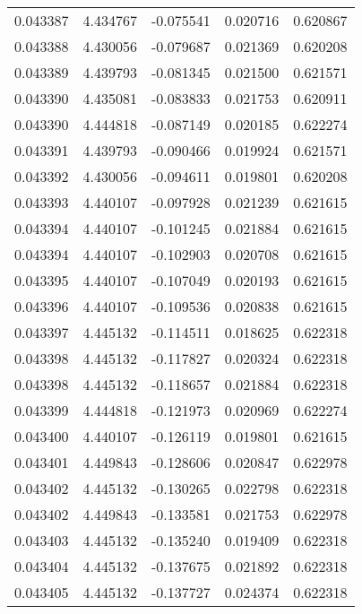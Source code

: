 \begin{tabular}{lrrrr}
0.043387    &  4.434767 & -0.075541 &  0.020716 &             0.620867 \\
0.043388    &  4.430056 & -0.079687 &  0.021369 &             0.620208 \\
0.043389    &  4.439793 & -0.081345 &  0.021500 &             0.621571 \\
0.043390    &  4.435081 & -0.083833 &  0.021753 &             0.620911 \\
0.043390    &  4.444818 & -0.087149 &  0.020185 &             0.622274 \\
0.043391    &  4.439793 & -0.090466 &  0.019924 &             0.621571 \\
0.043392    &  4.430056 & -0.094611 &  0.019801 &             0.620208 \\
0.043393    &  4.440107 & -0.097928 &  0.021239 &             0.621615 \\
0.043394    &  4.440107 & -0.101245 &  0.021884 &             0.621615 \\
0.043394    &  4.440107 & -0.102903 &  0.020708 &             0.621615 \\
0.043395    &  4.440107 & -0.107049 &  0.020193 &             0.621615 \\
0.043396    &  4.440107 & -0.109536 &  0.020838 &             0.621615 \\
0.043397    &  4.445132 & -0.114511 &  0.018625 &             0.622318 \\
0.043398    &  4.445132 & -0.117827 &  0.020324 &             0.622318 \\
0.043398    &  4.445132 & -0.118657 &  0.021884 &             0.622318 \\
0.043399    &  4.444818 & -0.121973 &  0.020969 &             0.622274 \\
0.043400    &  4.440107 & -0.126119 &  0.019801 &             0.621615 \\
0.043401    &  4.449843 & -0.128606 &  0.020847 &             0.622978 \\
0.043402    &  4.445132 & -0.130265 &  0.022798 &             0.622318 \\
0.043402    &  4.449843 & -0.133581 &  0.021753 &             0.622978 \\
0.043403    &  4.445132 & -0.135240 &  0.019409 &             0.622318 \\
0.043404    &  4.445132 & -0.137675 &  0.021892 &             0.622318 \\
0.043405    &  4.445132 & -0.137727 &  0.024374 &             0.622318 \\

\end{tabular}
